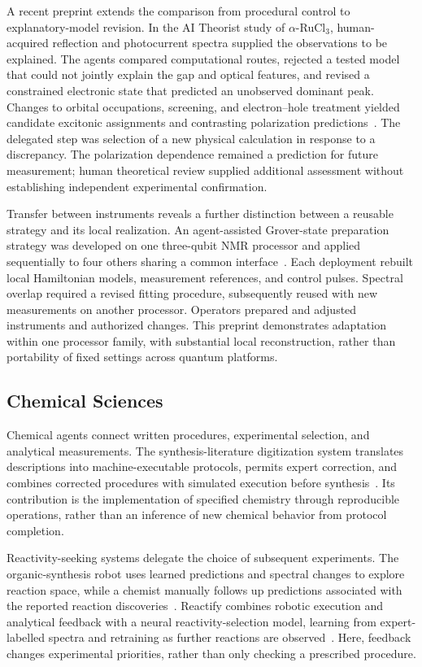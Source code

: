 A recent preprint extends the comparison from procedural control to explanatory-model revision. In the AI Theorist study of $\alpha$-RuCl$_3$, human-acquired reflection and photocurrent spectra supplied the observations to be explained. The agents compared computational routes, rejected a tested model that could not jointly explain the gap and optical features, and revised a constrained electronic state that predicted an unobserved dominant peak. Changes to orbital occupations, screening, and electron--hole treatment yielded candidate excitonic assignments and contrasting polarization predictions~\cite{asd1081}. The delegated step was selection of a new physical calculation in response to a discrepancy. The polarization dependence remained a prediction for future measurement; human theoretical review supplied additional assessment without establishing independent experimental confirmation.

Transfer between instruments reveals a further distinction between a reusable strategy and its local realization. An agent-assisted Grover-state preparation strategy was developed on one three-qubit NMR processor and applied sequentially to four others sharing a common interface~\cite{asd1064}. Each deployment rebuilt local Hamiltonian models, measurement references, and control pulses. Spectral overlap required a revised fitting procedure, subsequently reused with new measurements on another processor. Operators prepared and adjusted instruments and authorized changes. This preprint demonstrates adaptation within one processor family, with substantial local reconstruction, rather than portability of fixed settings across quantum platforms.

\subsection{Chemical Sciences}

Chemical agents connect written procedures, experimental selection, and analytical measurements. The synthesis-literature digitization system translates descriptions into machine-executable protocols, permits expert correction, and combines corrected procedures with simulated execution before synthesis~\cite{asd0600}. Its contribution is the implementation of specified chemistry through reproducible operations, rather than an inference of new chemical behavior from protocol completion.

Reactivity-seeking systems delegate the choice of subsequent experiments. The organic-synthesis robot uses learned predictions and spectral changes to explore reaction space, while a chemist manually follows up predictions associated with the reported reaction discoveries~\cite{asd0734}. Reactify combines robotic execution and analytical feedback with a neural reactivity-selection model, learning from expert-labelled spectra and retraining as further reactions are observed~\cite{asd0428}. Here, feedback changes experimental priorities, rather than only checking a prescribed procedure.

